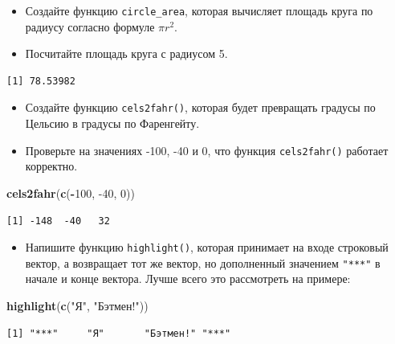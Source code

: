 \documentclass[
]{book}
\newenvironment{Shaded}{\begin{snugshade}}{\end{snugshade}}
\newcommand{\DecValTok}[1]{\textcolor[rgb]{0.00,0.00,0.81}{#1}}
\newcommand{\KeywordTok}[1]{\textcolor[rgb]{0.13,0.29,0.53}{\textbf{#1}}}
\newcommand{\NormalTok}[1]{#1}
\newcommand{\OperatorTok}[1]{\textcolor[rgb]{0.81,0.36,0.00}{\textbf{#1}}}
\newcommand{\StringTok}[1]{\textcolor[rgb]{0.31,0.60,0.02}{#1}}
\providecommand{\tightlist}{%
  \setlength{\itemsep}{0pt}\setlength{\parskip}{0pt}}
\begin{document}
\begin{itemize}
\item
  Создайте функцию \texttt{circle\_area}, которая вычисляет площадь круга по радиусу согласно формуле \(\pi r^2\).
\item
  Посчитайте площадь круга с радиусом 5.
\end{itemize}

\begin{verbatim}
[1] 78.53982
\end{verbatim}

\begin{itemize}
\item
  Создайте функцию \texttt{cels2fahr()}, которая будет превращать градусы по Цельсию в градусы по Фаренгейту.
\item
  Проверьте на значениях -100, -40 и 0, что функция \texttt{cels2fahr()} работает корректно.
\end{itemize}

\begin{Shaded}
\begin{Highlighting}[]
\KeywordTok{cels2fahr}\NormalTok{(}\KeywordTok{c}\NormalTok{(}\OperatorTok{-}\DecValTok{100}\NormalTok{, }\DecValTok{-40}\NormalTok{, }\DecValTok{0}\NormalTok{))}
\end{Highlighting}
\end{Shaded}

\begin{verbatim}
[1] -148  -40   32
\end{verbatim}

\begin{itemize}
\tightlist
\item
  Напишите функцию \texttt{highlight()}, которая принимает на входе строковый вектор, а возвращает тот же вектор, но дополненный значением \texttt{"***"} в начале и конце вектора. Лучше всего это рассмотреть на примере:
\end{itemize}

\begin{Shaded}
\begin{Highlighting}[]
\KeywordTok{highlight}\NormalTok{(}\KeywordTok{c}\NormalTok{(}\StringTok{"Я"}\NormalTok{, }\StringTok{"Бэтмен!"}\NormalTok{))}
\end{Highlighting}
\end{Shaded}

\begin{verbatim}
[1] "***"     "Я"       "Бэтмен!" "***"    
\end{verbatim}
\end{document}
